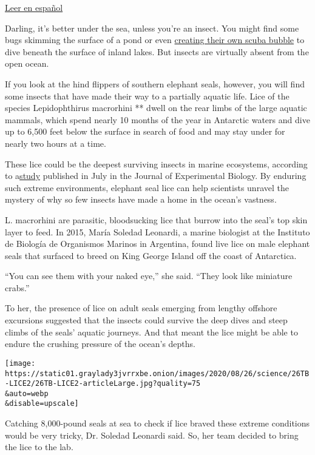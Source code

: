 \href{https://www.nytimes3xbfgragh.onion/es/2020/08/29/espanol/piojos-sobreviven.html}{Leer
en español}

Darling, it's better under the sea, unless you're an insect. You might
find some bugs skimming the surface of a pond or even
\href{https://www.nytimes3xbfgragh.onion/2017/11/21/science/diving-flies-mono-lake.html}{creating
their own scuba bubble} to dive beneath the surface of inland lakes. But
insects are virtually absent from the open ocean.

If you look at the hind flippers of southern elephant seals, however,
you will find some insects that have made their way to a partially
aquatic life. Lice of the species Lepidophthirus macrorhini ** dwell on
the rear limbs of the large aquatic mammals, which spend nearly 10
months of the year in Antarctic waters and dive up to 6,500 feet below
the surface in search of food and may stay under for nearly two hours at
a time.

These lice could be the deepest surviving insects in marine ecosystems,
according to
a\href{https://jeb.biologists.org/content/early/2020/07/16/jeb.226811}{study}
published in July in the Journal of Experimental Biology. By enduring
such extreme environments, elephant seal lice can help scientists
unravel the mystery of why so few insects have made a home in the
ocean's vastness.

L. macrorhini are parasitic, bloodsucking lice that burrow into the
seal's top skin layer to feed. In 2015, María Soledad Leonardi, a marine
biologist at the Instituto de Biología de Organismos Marinos in
Argentina, found live lice on male elephant seals that surfaced to breed
on King George Island off the coast of Antarctica.

``You can see them with your naked eye,'' she said. ``They look like
miniature crabs.''

To her, the presence of lice on adult seals emerging from lengthy
offshore excursions suggested that the insects could survive the deep
dives and steep climbs of the seals' aquatic journeys. And that meant
the lice might be able to endure the crushing pressure of the ocean's
depths.

\texttt{[image: https://static01.graylady3jvrrxbe.onion/images/2020/08/26/science/26TB-LICE2/26TB-LICE2-articleLarge.jpg?quality=75\\\&auto=webp\\\&disable=upscale]}

Catching 8,000-pound seals at sea to check if lice braved these extreme
conditions would be very tricky, Dr. Soledad Leonardi said. So, her team
decided to bring the lice to the lab.

